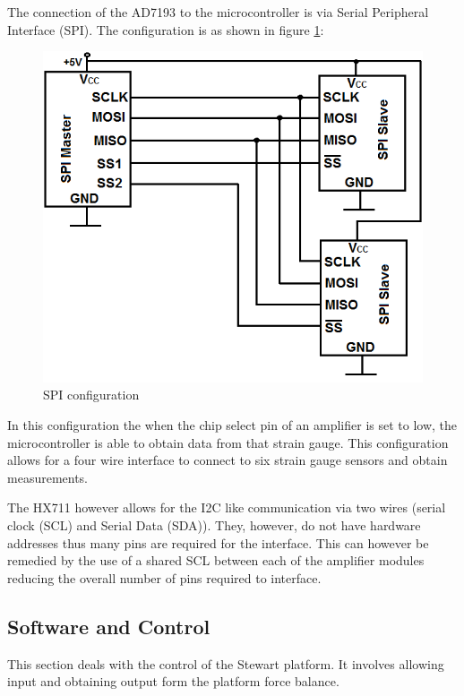 The connection of the AD7193 to the microcontroller is via Serial Peripheral Interface (SPI). The configuration is as shown in figure \ref{spi}:
\begin{center}
	\begin{figure}[H]
		\centering
		\includegraphics[width=0.55\linewidth]{Figures/SPI}
		\caption[SPI configuration]{SPI configuration}
		\label{spi}
	\end{figure}
\end{center}
In this configuration the when the chip select pin of an amplifier is set to low, the microcontroller is able to obtain data from that strain gauge. This configuration allows for a four wire interface to connect to six strain gauge sensors and obtain measurements.

The HX711 however allows for the I2C like communication via two wires (serial clock (SCL) and Serial Data (SDA)). They, however, do not have hardware addresses thus many pins are required for the interface. This can however be remedied by the use of a shared SCL between each of the amplifier modules reducing the overall number of pins required to interface.

\subsection{Software and Control}
This section deals with the control of the Stewart platform. It involves allowing input and obtaining output form the platform force balance.
